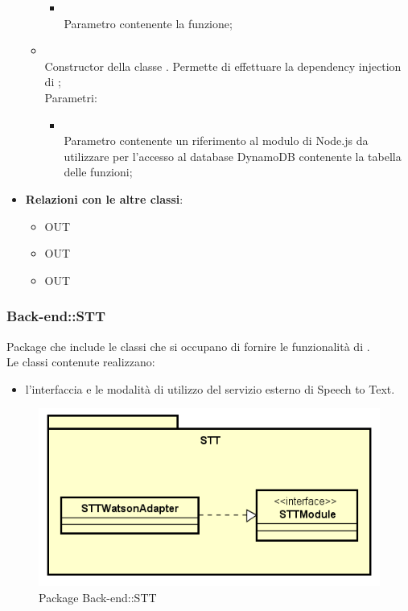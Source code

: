 \begin{itemize}
\begin{itemize}
		\begin{itemize}
			\item {} \\
			Parametro contenente la funzione;
		\end{itemize}
		\item[]  \\		Constructor della classe . Permette di effettuare la dependency injection di ;\\
		Parametri:
		\begin{itemize}
			\item {} \\
			Parametro contenente un riferimento al modulo di Node.js da utilizzare per l'accesso al database DynamoDB contenente la tabella delle funzioni;
		\end{itemize}
	\end{itemize}
	\item \textbf{Relazioni con le altre classi}:
	\begin{itemize}
		\item OUT \hyperlink{Task_label}{}
		\item OUT \hyperlink{TaskObservable_label}{}
		\item OUT \hyperlink{ErrorObservable_label}{}
	\end{itemize}
\end{itemize}
\FloatBarrier
\newpage
\subsubsection{Back-end::STT}
Package che include le classi che si occupano di fornire le funzionalità di .\\
Le classi contenute realizzano:
\begin{itemize}
 \item l'interfaccia e le modalità di utilizzo del servizio esterno di Speech to Text.
\end{itemize}
\begin{figure}[h] \centering \includegraphics[width=\textwidth,height=\textheight,keepaspectratio]{images/diagrams/back-end/Official_Backend_0304/STT.png}
	\caption{Package Back-end::STT}
\end{figure}
